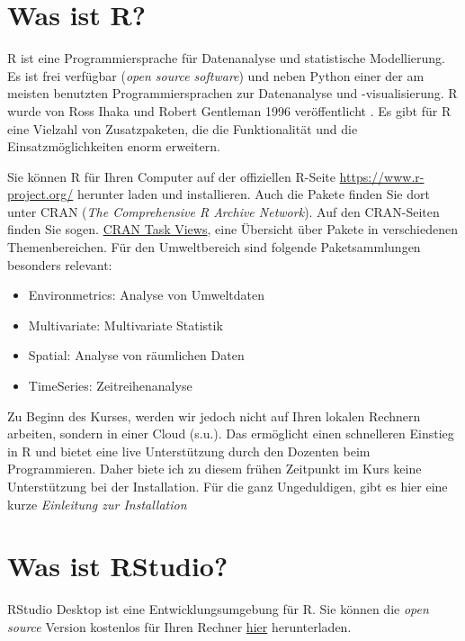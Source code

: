 \documentclass[]{book}
\providecommand{\tightlist}{%
  \setlength{\itemsep}{0pt}\setlength{\parskip}{0pt}}
\begin{document}
\hypertarget{was-ist-r}{%
\section{Was ist R?}\label{was-ist-r}}

R ist eine Programmiersprache für Datenanalyse und statistische Modellierung. Es ist frei verfügbar (\emph{open source software}) und neben Python einer der am meisten benutzten Programmiersprachen zur Datenanalyse und -visualisierung. R wurde von Ross Ihaka und Robert Gentleman 1996 veröffentlicht \citet{Ihaka1996}. Es gibt für R eine Vielzahl von Zusatzpaketen, die die Funktionalität und die Einsatzmöglichkeiten enorm erweitern.

Sie können R für Ihren Computer auf der offiziellen R-Seite \url{https://www.r-project.org/} herunter laden und installieren. Auch die Pakete finden Sie dort unter CRAN (\emph{The Comprehensive R Archive Network}). Auf den CRAN-Seiten finden Sie sogen. \href{http://cran.r-project.org/web/views/}{CRAN Task Views}, eine Übersicht über Pakete in verschiedenen Themenbereichen. Für den Umweltbereich sind folgende Paketsammlungen besonders relevant:

\begin{itemize}
\tightlist
\item
  Environmetrics: Analyse von Umweltdaten
\item
  Multivariate: Multivariate Statistik
\item
  Spatial: Analyse von räumlichen Daten
\item
  TimeSeries: Zeitreihenanalyse
\end{itemize}

Zu Beginn des Kurses, werden wir jedoch nicht auf Ihren lokalen Rechnern arbeiten, sondern in einer Cloud (s.u.). Das ermöglicht einen schnelleren Einstieg in R und bietet eine live Unterstützung durch den Dozenten beim Programmieren. Daher biete ich zu diesem frühen Zeitpunkt im Kurs keine Unterstützung bei der Installation. Für die ganz Ungeduldigen, gibt es hier eine kurze \emph{Einleitung zur Installation}

\hypertarget{was-ist-rstudio}{%
\section{Was ist RStudio?}\label{was-ist-rstudio}}

RStudio Desktop ist eine Entwicklungsumgebung für R. Sie können die \emph{open source} Version kostenlos für Ihren Rechner \href{https://rstudio.com/products/rstudio/\#rstudio-desktop}{hier} herunterladen.
\end{document}
